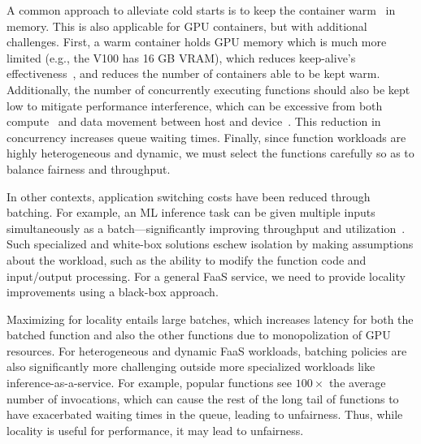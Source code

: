 A common approach to alleviate cold starts is to keep the container warm~\cite{faascache-asplos21} in memory.
This is also applicable for GPU containers, but with additional challenges.
First, a warm container holds GPU memory which is much more limited (e.g., the V100 has 16 GB VRAM), which reduces keep-alive's effectiveness~\cite{faascache-asplos21}, and reduces the number of containers able to be kept warm.
Additionally, the number of concurrently executing functions should also be kept low to mitigate performance interference, which can be excessive from both compute~\cite{yamagiwa2009performance,phull2012interference} and data movement between host and device~\cite{yu2019automatic, hong2017gpu}.
This reduction in concurrency increases queue waiting times.
Finally, since function workloads are highly heterogeneous and dynamic, we must select the  functions carefully so as to balance fairness and throughput.


In other contexts, application switching costs have been reduced through batching.
For example, an ML inference task can be given multiple inputs simultaneously as a batch---significantly improving throughput and utilization~\cite{ali_batch_2020,yang2022infless,ali2022optimizing}.
Such specialized and white-box solutions eschew isolation by making assumptions about the workload, such as the ability to modify the function code and input/output processing. 
For a general FaaS service, we need to provide locality improvements using a black-box approach.


Maximizing for locality entails large batches, which increases latency for both the batched function and also the other functions due to monopolization of GPU resources.  
For heterogeneous and dynamic FaaS workloads, batching policies are also significantly more challenging outside more specialized workloads like inference-as-a-service.
For example, popular functions see $100\times$ the average number of invocations, which can cause the rest of the long tail of functions to have exacerbated waiting times in the queue, leading to unfairness. 
Thus, while locality is useful for performance, it may lead to unfairness. 

